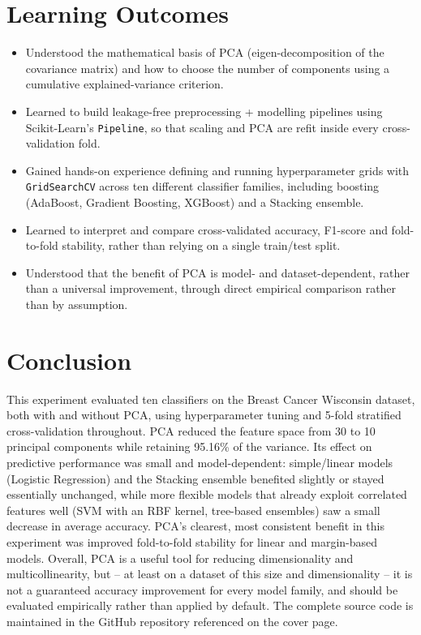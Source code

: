 \documentclass[12pt,a4paper]{article}
\begin{document}
\section{Learning Outcomes}
\begin{itemize}[leftmargin=*]
    \item Understood the mathematical basis of PCA (eigen-decomposition of the covariance matrix) and how to choose the number of components using a cumulative explained-variance criterion.
    \item Learned to build leakage-free preprocessing + modelling pipelines using Scikit-Learn's \texttt{Pipeline}, so that scaling and PCA are refit inside every cross-validation fold.
    \item Gained hands-on experience defining and running hyperparameter grids with \texttt{GridSearchCV} across ten different classifier families, including boosting (AdaBoost, Gradient Boosting, XGBoost) and a Stacking ensemble.
    \item Learned to interpret and compare cross-validated accuracy, F1-score and fold-to-fold stability, rather than relying on a single train/test split.
    \item Understood that the benefit of PCA is model- and dataset-dependent, rather than a universal improvement, through direct empirical comparison rather than by assumption.
\end{itemize}

\section{Conclusion}
This experiment evaluated ten classifiers on the Breast Cancer Wisconsin dataset, both with and without PCA, using hyperparameter tuning and 5-fold stratified cross-validation throughout. PCA reduced the feature space from 30 to 10 principal components while retaining 95.16\% of the variance. Its effect on predictive performance was small and model-dependent: simple/linear models (Logistic Regression) and the Stacking ensemble benefited slightly or stayed essentially unchanged, while more flexible models that already exploit correlated features well (SVM with an RBF kernel, tree-based ensembles) saw a small decrease in average accuracy. PCA's clearest, most consistent benefit in this experiment was improved fold-to-fold stability for linear and margin-based models. Overall, PCA is a useful tool for reducing dimensionality and multicollinearity, but -- at least on a dataset of this size and dimensionality -- it is not a guaranteed accuracy improvement for every model family, and should be evaluated empirically rather than applied by default. The complete source code is maintained in the GitHub repository referenced on the cover page.
\end{document}
